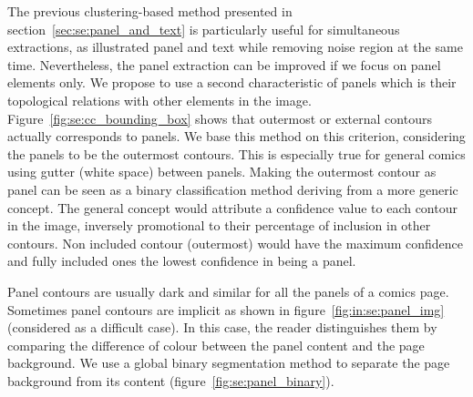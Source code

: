 The previous clustering-based method presented in section~\ref{sec:se:panel_and_text} is particularly useful for simultaneous extractions, as illustrated panel and text while removing noise region at the same time.
Nevertheless, the panel extraction can be improved if we focus on panel elements only.
We propose to use a second characteristic of panels which is their topological relations with other elements in the image.
Figure~\ref{fig:se:cc_bounding_box} shows that outermost or external contours actually corresponds to panels.
We base this method on this criterion, considering the panels to be the outermost contours.
This is especially true for general comics using gutter (white space) between panels.
Making the outermost contour as panel can be seen as a binary classification method deriving from a more generic concept.
The general concept would attribute a confidence value to each contour in the image, inversely promotional to their percentage of inclusion in other contours.
Non included contour (outermost) would have the maximum confidence and fully included ones the lowest confidence in being a panel.


Panel contours are usually dark and similar for all the panels of a comics page.
Sometimes panel contours are implicit as shown in figure~\ref{fig:in:se:panel_img} (considered as a difficult case).
In this case, the reader distinguishes them by comparing the difference of colour between the panel content and the page background.
We use a global binary segmentation method to separate the page background from its content (figure~\ref{fig:se:panel_binary}).

